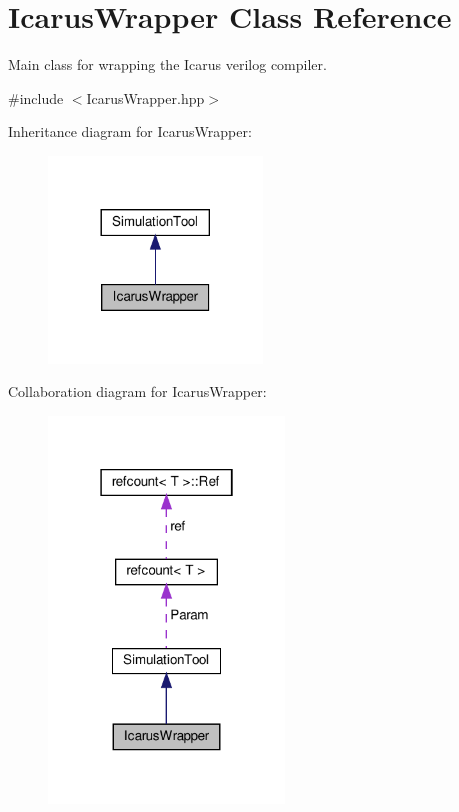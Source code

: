 \hypertarget{classIcarusWrapper}{}\section{Icarus\+Wrapper Class Reference}
\label{classIcarusWrapper}


Main class for wrapping the Icarus verilog compiler.  




{\ttfamily \#include $<$Icarus\+Wrapper.\+hpp$>$}



Inheritance diagram for Icarus\+Wrapper\+:
\nopagebreak
\begin{figure}[H]
\begin{center}
\leavevmode
\includegraphics[width=161pt]{d4/d51/classIcarusWrapper__inherit__graph}
\end{center}
\end{figure}


Collaboration diagram for Icarus\+Wrapper\+:
\nopagebreak
\begin{figure}[H]
\begin{center}
\leavevmode
\includegraphics[width=178pt]{da/d51/classIcarusWrapper__coll__graph}
\end{center}
\end{figure}
